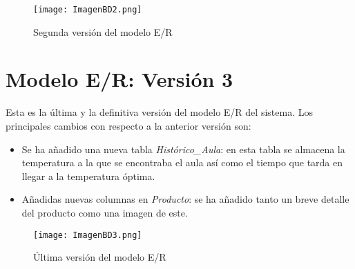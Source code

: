 \documentclass[12pt]{report}
\begin{document}
\begin{figure}[H]
    \centering
    \texttt{[image: ImagenBD2.png]}
    \caption{Segunda versión del modelo E/R}
    \label{fig:Figura3.4.2}
\end{figure}

\section{Modelo E/R: Versión 3}
Esta es la última y la definitiva versión del modelo E/R del sistema. Los principales cambios con respecto a la anterior versión son:
\begin{itemize}
    \item Se ha añadido una nueva tabla \textit{Histórico\_Aula}: en esta tabla se almacena la temperatura a la que se encontraba el aula así como el tiempo que tarda en llegar a la temperatura óptima.
    \item Añadidas nuevas columnas en \textit{Producto}: se ha añadido tanto un breve detalle del producto como una imagen de este.
\end{itemize} 

\begin{figure}[H]
    \centering
    \texttt{[image: ImagenBD3.png]}
    \caption{Última versión del modelo E/R}
    \label{fig:Figura3.4.3}
\end{figure}
\end{document}
